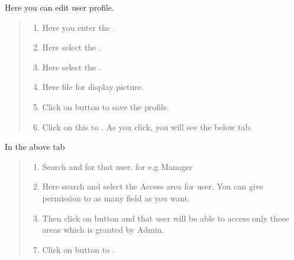 \documentclass[letterpaper,10pt,english]{sphinxmanual}
\begin{document}
\begin{figure}[htbp]
\centering

\noindent{}
\end{figure}

Here you can edit user profile.
\begin{quote}
\begin{enumerate}
\item {} 
Here you enter the   .

\item {} 
Here select the  .

\item {} 
Here select the  .

\item {} 
Here  file for display picture.

\item {} 
Click on  button to save the profile.

\end{enumerate}
\begin{enumerate}
\setcounter{enumi}{5}
\item {} 
Click on this  to  . As you click, you will see the below tab.

\end{enumerate}
\end{quote}

\begin{figure}[htbp]
\centering

\noindent{}
\end{figure}

In the above tab
\begin{quote}
\begin{enumerate}
\item {} 
Search and  for that user. for e.g Manager

\item {} 
Here search and select the Access area for user, You can give permission to as many field as you want.

\item {} 
Then click on  button and that user will be able to access only those areas which is granted by Admin.

\end{enumerate}
\begin{enumerate}
\setcounter{enumi}{6}
\item {} 
Click on  button to  .

\end{enumerate}
\end{quote}
\end{document}
